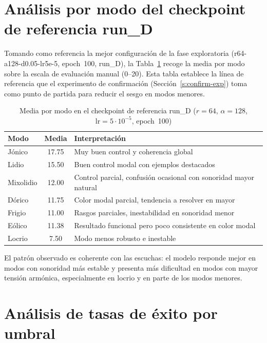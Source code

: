 \documentclass[%
    school=etsisi,%
    type=pfg,%
    degree=61CD,%
]{upm-report}
\begin{document}
\section{An\'alisis por modo del checkpoint de referencia run\_D}
\label{s:analisis-modos-ref}

Tomando como referencia la mejor configuraci\'on de la fase exploratoria (r64-a128-d0.05-lr5e-5, epoch~100, run\_D), la Tabla~\ref{tab:analisis-modos} recoge la media por modo sobre la escala de evaluaci\'on manual (0--20). Esta tabla establece la l\'inea de referencia que el experimento de confirmaci\'on (Secci\'on~\ref{s:confirm-exp}) toma como punto de partida para reducir el sesgo en modos menores.

\begin{table}[H]
    \centering
    \caption{Media por modo en el checkpoint de referencia run\_D ($r=64$, $\alpha=128$, $\text{lr}=5\cdot10^{-5}$, epoch~100)}
    \label{tab:analisis-modos}
    \begin{tabular}{lcl}
        \toprule
        \textbf{Modo} & \textbf{Media} & \textbf{Interpretaci\'on} \\
        \midrule
        J\'onico & 17.75 & Muy buen control y coherencia global \\
        Lidio & 15.50 & Buen control modal con ejemplos destacados \\
        Mixolidio & 12.00 & Control parcial, confusi\'on ocasional con sonoridad mayor natural \\
        D\'orico & 11.75 & Color modal parcial, tendencia a resolver en mayor \\
        Frigio & 11.00 & Rasgos parciales, inestabilidad en sonoridad menor \\
        E\'olico & 11.38 & Resultado funcional pero poco consistente en color modal \\
        Locrio & 7.50 & Modo menos robusto e inestable \\
        \bottomrule
    \end{tabular}
\end{table}

El patr\'on observado es coherente con las escuchas: el modelo responde mejor en modos con sonoridad m\'as estable y presenta m\'as dificultad en modos con mayor tensi\'on arm\'onica, especialmente en locrio y en parte de los modos menores.

\section{An\'alisis de tasas de \'exito por umbral}
\label{s:tasas-exito-umbral}
\end{document}
